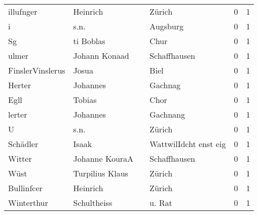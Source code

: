 \begin{tabular}{llllrr}
                illufnger &                           Heinrich &             &                                      Zürich &          0 &         1 \\
                        i &                               s.n. &             &                                    Augsburg &          0 &         1 \\
                       Sg &                          ti Boblas &             &                                        Chur &          0 &         1 \\
                    ulmer &                      Johann Konaad &             &                                Schaffhausen &          0 &         1 \\
         FinslerVinslerus &                              Josua &             &                                        Biel &          0 &         1 \\
                   Herter &                           Johannes &             &                                     Gachnag &          0 &         1 \\
                     Egll &                             Tobias &             &                                        Chor &          0 &         1 \\
                   lerter &                           Johannes &             &                                    Gachnang &          0 &         1 \\
                        U &                               s.n. &             &                                      Zürich &          0 &         1 \\
                 Schädler &                              Isaak &             &                       WattwilIdcht enst eig &          0 &         1 \\
                   Witter &                     Johanne KouraA &             &                                Schaffhausen &          0 &         1 \\
                     Wüst &                    Turpilius Klaus &             &                                      Zürich &          0 &         1 \\
               Bullinfcer &                           Heinrich &             &                                      Zürich &          0 &         1 \\
               Winterthur &                        Schultheiss &             &                                      u. Rat &          0 &         1 \\

\end{tabular}
